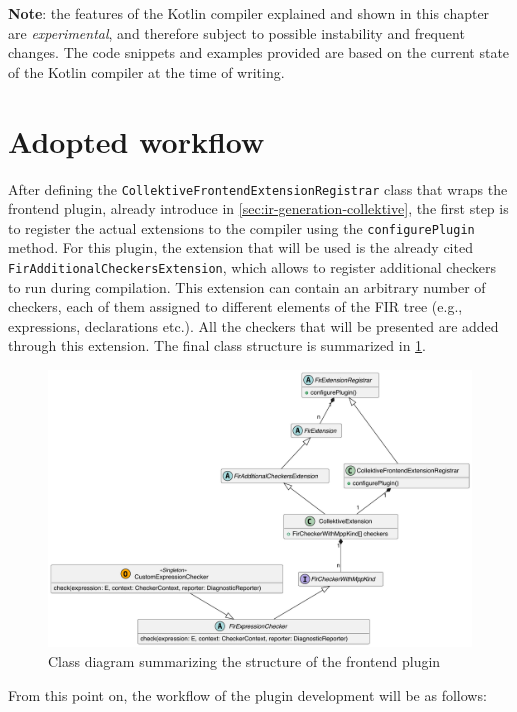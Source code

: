 \documentclass[12pt,a4paper,openright,twoside]{book}
\begin{document}
\textbf{Note}: the features of the Kotlin compiler explained and shown in
this chapter are \emph{experimental}, and therefore subject to possible instability
and frequent changes. The code snippets and examples provided are based on the
current state of the Kotlin compiler at the time of writing. 

\section{Adopted workflow}

After defining the \lstinline{CollektiveFrontendExtensionRegistrar} class that
wraps the frontend plugin, already introduce in \cref{sec:ir-generation-collektive}, the
first step is to register the actual extensions to the compiler using the
\lstinline{configurePlugin} method. For this plugin, the extension that will
be used is the already cited \lstinline{FirAdditionalCheckersExtension}, which
allows to register additional checkers to run during compilation.
%
This extension can contain an arbitrary number of checkers, each of them
assigned to different elements of the \ac{FIR} tree (e.g., expressions,
declarations etc.). All the checkers that will be presented are added 
through this extension. The final class structure is summarized in
\cref{fig:frontend-class-diagram}.

\begin{figure}
  \centering
  \includegraphics[width=.8\linewidth]{figures/frontend-class-diagram.pdf}
  \caption{Class diagram summarizing the structure of the frontend plugin}
  \label{fig:frontend-class-diagram}
\end{figure}

From this point on, the workflow of the plugin development will be as follows:
\end{document}
